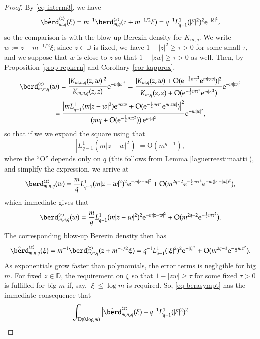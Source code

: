\documentclass{birkart}
\theoremstyle{definition}
\theoremstyle{remark}
\numberwithin{equation}{section}
\numberwithin{figure}{section}
\newcommand{\e}{\mathrm e}
\newcommand{\1}{{\mathbf 1}}
\newcommand{\Rpar}{q}
\newcommand{\D}{{\mathbb D}}
\newcommand{\Ordo}{\mathrm{O}}
\begin{document}
\begin{proof}
By \eqref{eq-interm3}, we have
\[
\hat{\berd}^{\langle z\rangle}_{m,\Rpar}(\xi) = 
m^{-1}\berd^{\langle z\rangle}_{m,\Rpar}(z+m^{-1/2}\xi)=
\Rpar^{-1}L^{1}_{\Rpar-1}(|\xi|^2)^2\e^{-|\xi|^2},
\]
so the comparison is with the blow-up Berezin density for $K_{m,\Rpar}$.
We write $w:=z+m^{-1/2}\xi$; since $z\in\D$ is fixed, we have 
$1-|z|^2\ge\tau>0$ for some small $\tau$, and we suppose that $w$ is close
to $z$ so that $1-|zw|\ge\tau>0$ as well.
Then, by Proposition \ref{prop-repkern} and Corollary \ref{cor-kapprox}, 
\begin{multline*}
\berd^{\langle z\rangle}_{m,n,\Rpar}(w)= 
\frac{|K_{m,n,\Rpar}(z,w)|^2}{K_{m,n,\Rpar}(z,z)}\e^{-m|w|^2} 
=\frac{|K_{m,\Rpar}(z,w)+\Ordo(\e^{-\frac12 m\tau^2}\e^{m|zw|}) 
|^2}{K_{m,\Rpar}(z,z)+ \Ordo(\e^{-\frac12 m\tau^2}\e^{m|z|^2})}
\e^{-m|w|^2}  
\\
=\frac{\big|mL^{1}_{\Rpar-1}(m|z-w|^2)
\e^{mz\bar{w}} + \Ordo(\e^{-\frac12 m\tau^2}\e^{m|zw|})  
\big|^2}{(m\Rpar+\Ordo(\e^{-\frac12 m\tau^2}))\,\e^{m|z|^2}}\e^{-m|w|^2}, 
\end{multline*}
so that if we we expand the square using that
\[
|L^1_{\Rpar-1}(m|z-w|^2)|=\Ordo(m^{\Rpar-1}),
\]
where the ``O'' depends only on $q$ (this follows from Lemma 
\ref{laguerreestimaatti}), and simplify the expression, we arrive at
\[
\berd^{\langle z\rangle}_{m,n,\Rpar}(w)=
\frac{m}{\Rpar}L^{1}_{\Rpar-1}(m|z-w|^2)^2
\e^{-m|z-w|^2} + 
\Ordo(m^{2\Rpar-2}\e^{-\frac12 m\tau^2}\e^{-m(|z|-|w|)^2}),    
\]
which immediate gives that
\[
\berd^{\langle z\rangle}_{m,n,\Rpar}(w)=
\frac{m}{\Rpar}L^{1}_{\Rpar-1}(m|z-w|^2)^2
\e^{-m|z-w|^2} + 
\Ordo(m^{2\Rpar-2}\e^{-\frac12 m\tau^2}).    
\]
The corresponding blow-up Berezin density then has
\begin{equation}
\label{eq-berasympt}
\hat\berd^{\langle z\rangle}_{m,n,\Rpar}(\xi)
=m^{-1}\berd^{\langle z\rangle}_{m,n,\Rpar}(z+m^{-1/2}\xi)
=\Rpar^{-1}L^{1}_{\Rpar-1}(|\xi|^2)^2
\e^{-|\xi|^2} + 
\Ordo(m^{2\Rpar-3}\e^{-\frac12 m\tau^2}).    
\end{equation}
As exponentials grow faster than polynomials, the error terms is negligible
for big $m$. For fixed $z\in\D$, the requirement on $\xi$ so that $1-|zw|\ge
\tau$ for some fixed $\tau>0$ is fulfilled for big $m$ if, say, 
$|\xi|\le\log m$ is required. So, \eqref{eq-berasympt} has the immediate
consequence that
\begin{equation}
\label{eq-berasympt2}
\int_{\D(0,\log m)}
\big|\hat\berd^{\langle z\rangle}_{m,n,\Rpar}(\xi)
-\Rpar^{-1}L^{1}_{\Rpar-1}(|\xi|^2)^2

\end{equation}
\end{proof}
\end{document}
